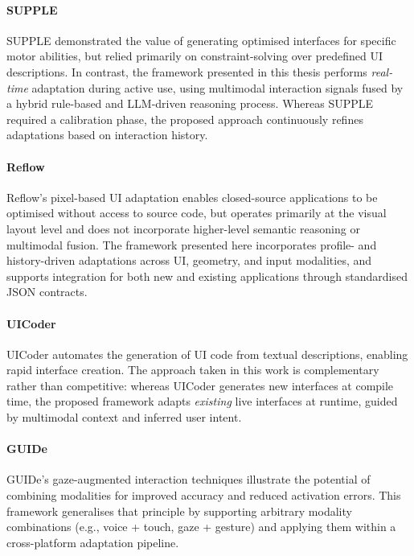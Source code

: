 \documentclass[openany]{book}
\begin{document}
\paragraph{SUPPLE \cite{Gajos2008SUPPLE}}
SUPPLE demonstrated the value of generating optimised interfaces for specific motor abilities, but relied primarily on constraint-solving over predefined UI descriptions. In contrast, the framework presented in this thesis performs \emph{real-time} adaptation during active use, using multimodal interaction signals fused by a hybrid rule-based and LLM-driven reasoning process. Whereas SUPPLE required a calibration phase, the proposed approach continuously refines adaptations based on interaction history.

\paragraph{Reflow \cite{Wu2024}}
Reflow’s pixel-based UI adaptation enables closed-source applications to be optimised without access to source code, but operates primarily at the visual layout level and does not incorporate higher-level semantic reasoning or multimodal fusion. The framework presented here incorporates profile- and history-driven adaptations across UI, geometry, and input modalities, and supports integration for both new and existing applications through standardised JSON contracts.

\paragraph{UICoder \cite{Wu2024}}
UICoder automates the generation of UI code from textual descriptions, enabling rapid interface creation. The approach taken in this work is complementary rather than competitive: whereas UICoder generates new interfaces at compile time, the proposed framework adapts \emph{existing} live interfaces at runtime, guided by multimodal context and inferred user intent.

\paragraph{GUIDe \cite{kumar2007guide}}
GUIDe’s gaze-augmented interaction techniques illustrate the potential of combining modalities for improved accuracy and reduced activation errors. This framework generalises that principle by supporting arbitrary modality combinations (e.g., voice + touch, gaze + gesture) and applying them within a cross-platform adaptation pipeline.
\end{document}
